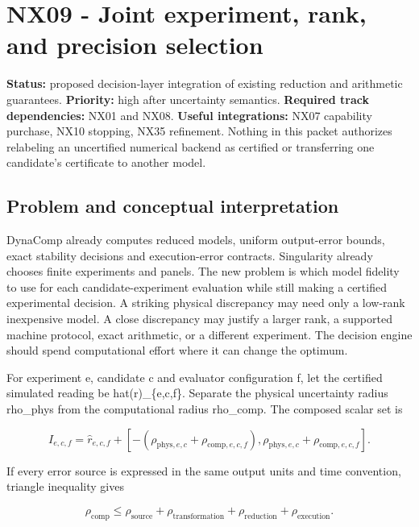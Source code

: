 \documentclass[
  11pt,
  a4paper,
]{report}
\begin{document}
\hypertarget{nx09---joint-experiment-rank-and-precision-selection}{%
\chapter{NX09 - Joint experiment, rank, and precision
selection}\label{nx09---joint-experiment-rank-and-precision-selection}}

\textbf{Status:} proposed decision-layer integration of existing
reduction and arithmetic guarantees. \textbf{Priority:} high after
uncertainty semantics. \textbf{Required track dependencies:} NX01 and
NX08. \textbf{Useful integrations:} NX07 capability purchase, NX10
stopping, NX35 refinement. Nothing in this packet authorizes relabeling
an uncertified numerical backend as certified or transferring one
candidate's certificate to another model.

\hypertarget{problem-and-conceptual-interpretation}{%
\section{Problem and conceptual
interpretation}\label{problem-and-conceptual-interpretation}}

DynaComp already computes reduced models, uniform output-error bounds,
exact stability decisions and execution-error contracts. Singularity
already chooses finite experiments and panels. The new problem is which
model fidelity to use for each candidate-experiment evaluation while
still making a certified experimental decision. A striking physical
discrepancy may need only a low-rank inexpensive model. A close
discrepancy may justify a larger rank, a supported machine protocol,
exact arithmetic, or a different experiment. The decision engine should
spend computational effort where it can change the optimum.

For experiment e, candidate c and evaluator configuration f, let the
certified simulated reading be hat(r)\_\{e,c,f\}. Separate the physical
uncertainty radius rho\_phys from the computational radius rho\_comp.
The composed scalar set is

\[
I_{e,c,f}=\widehat r_{e,c,f}+[-(\rho_{\mathrm{phys},e,c}+\rho_{\mathrm{comp},e,c,f}),\rho_{\mathrm{phys},e,c}+\rho_{\mathrm{comp},e,c,f}].
\]

If every error source is expressed in the same output units and time
convention, triangle inequality gives

\[
\rho_{\mathrm{comp}}\le\rho_{\mathrm{source}}+\rho_{\mathrm{transformation}}+\rho_{\mathrm{reduction}}+\rho_{\mathrm{execution}}.
\]
\end{document}
